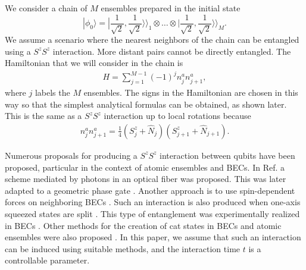 \documentclass{WileyMSP-template}
\begin{document}


We consider a chain of $ M $ ensembles prepared in the initial state
%
%
\begin{equation}
|\phi_0 \rangle=|\frac{1}{\sqrt{2}},\frac{1}{\sqrt{2}}\rangle\rangle_{1}\otimes\dots\otimes|\frac{1}{\sqrt{2}},\frac{1}{\sqrt{2}}\rangle\rangle_{M} .  \label{initstate}
\end{equation}
%
We assume a scenario where the nearest neighbors of the chain can be entangled using a $ S^z S^z $  interaction. More distant pairs cannot be directly entangled.  The Hamiltonian that we will consider in the chain is
%
\begin{align}
H=  \sum_{j=1}^{M-1} (-1)^j n_j^a n_{j+1}^a ,
\label{mainham}
\end{align}
%
where $ j$ labels the  $M $ ensembles. The signs in the Hamiltonian are chosen in this way so that the simplest analytical formulas can be obtained, as shown later.
 This is the same as a $ S^z S^z $ interaction up to local rotations because
%
\begin{align}
n^a_j n_{j+1}^a = \frac{1}{4} (S^z_j + \hat{N}_j) (S^z_{j+1} + \hat{N}_{j+1} ).
\end{align}

Numerous proposals for producing a $ S^z S^z $ interaction between qubits have been proposed, particular in the context of atomic ensembles and BECs.  In Ref. \cite{pyrkov2013entanglement} a scheme mediated by photons in an optical fiber was proposed.  This was later adapted to a geometric phase gate \cite{hussain2014geometric}. Another approach is to use spin-dependent forces on neighboring BECs \cite{treutlein2006}.
Such an interaction is also produced when one-axis squeezed states are split \cite{Jing_2019}.  This type of entanglement was  experimentally realized in BECs \cite{fadel2018spatial,Colciaghi2023}. Other methods for the creation of cat states in BECs and atomic ensembles were also proposed \cite{simon14,nori21}.   In this paper, we assume that such an interaction can be induced using suitable methods, and the interaction time $ t $ is a controllable parameter.
\end{document}
